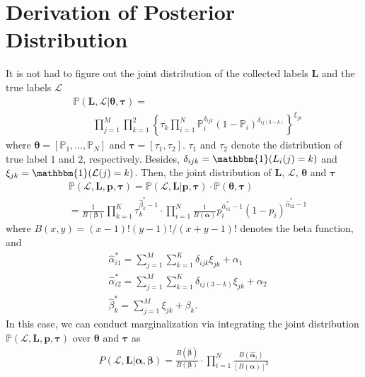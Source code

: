 \documentclass{article}
\begin{document}
\section{Derivation of Posterior Distribution}
It is not had to figure out the joint distribution of the collected labels $\bm{L}$ and the true labels $\mathcal{L}$ 
\begin{equation*}
\label{JointDist}
\begin{split}
    &\mathbb{P}(\bm{L}, \mathcal{L}| \bm{\theta}, \bm{\tau})=\\ &\qquad {\prod}_{j=1}^{M}{\prod}_{k=1}^{2}\left\{\tau_{k}\prod_{i=1}^{N}\mathbb{P}_i^{\delta_{ijk}}(1-\mathbb{P}_i)^{\delta_{ij(3-k)}} \right\}^{\xi_{jk}}
\end{split}
\end{equation*}
where $\bm{\theta}=[\mathbb{P}_1,\ldots, \mathbb{P}_N]$ and $\bm{\tau}=[\tau_1,\tau_2]$. $\tau_1$ and $\tau_2$ denote the distribution of true label $1$ and $2$, respectively.
Besides,  $\delta_{ijk}=\mathbbm{1}(L_i(j)=k)$ and $\xi_{jk}= \mathbbm{1}(\mathcal{L}(j)=k)$.
Then, the joint distribution of $\bm{L}$, $\mathcal{L}$, $\bm{\theta}$ and $\bm{\tau}$ 
\begin{equation*}
\label{JointDist2}
\begin{split}
&\mathbb{P}(\mathcal{L},\bm{L},\bm{p}, \bm{\tau})=\mathbb{P}(\mathcal{L},\bm{L}|\bm{p}, \bm{\tau})\cdot \mathbb{P}(\bm{\theta}, \bm{\tau})\\
&=\frac{1}{B(\bm{\beta})}\prod_{k=1}^{K}\tau_k^{\hat{\beta}^{*}_k-1}\cdot\prod_{i=1}^{N}\frac{1}{B(\bm{\alpha})}p_i^{\hat{\alpha}^{*}_{i1}-1}(1-p_i)^{\hat{\alpha}^{*}_{i2}-1}
\end{split}
\end{equation*}
where $B(x,y)=(x-1)!(y-1)!/(x+y-1)!$ denotes the beta function, and
\begin{equation*}
\begin{split}
&\hat{\alpha}^{*}_{i1}={\sum}_{j=1}^{M}{\sum}_{k=1}^{K}\delta_{ijk}\xi_{jk}+\alpha_{1}\\
&\hat{\alpha}^{*}_{i2}={\sum}_{j=1}^{M}{\sum}_{k=1}^{K}\delta_{ij(3-k)}\xi_{jk}+\alpha_{2}\\
&\hat{\beta}^{*}_k={\sum}_{j=1}^{M}\xi_{jk}+\beta_{k}.
\end{split}
\end{equation*}
In this case, we can conduct marginalization via integrating the joint distribution $\mathbb{P}(\mathcal{L},\bm{L},\bm{p}, \bm{\tau})$ over $\bm{\theta}$ and $\bm{\tau}$ as
\begin{equation}
\label{marginalization}
\begin{split}
P(\mathcal{L},\bm{L}|\bm{\alpha}, \bm{\beta})=\frac{B(\hat{\bm{\beta}})}{B(\bm{\beta})}\cdot {\prod}_{i=1}^{N}\frac{B(\hat{\bm{\alpha}}_{i})}{[B(\bm{\alpha})]^2}
\end{split}
\end{equation}
\end{document}
